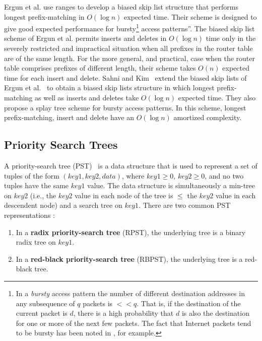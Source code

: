 Ergun et al. \cite{ergun} use ranges to develop a biased skip list structure
that performs longest prefix-matching in $O(\log n)$ expected time. Their scheme
is designed to
give good expected performance for bursty\footnote{In
a {\em bursty}
access pattern the number of different destination addresses in any
subsequence of $q$ packets is
$<< q$. That is, if the destination of the
current packet is $d$, there is a high probability that $d$ is
also the destination for one or more of the next few packets.
The fact that Internet packets tend to be bursty has been
noted in \cite{claffy,lin}, for example.}
access patterns''.
The biased skip list scheme of Ergun et al. \cite{ergun} permits
inserts and deletes in $O(\log n)$ time only in the severely restricted and
impractical situation when all prefixes in the router table are of the same
length. For the more general, and practical, case when the router table
comprises prefixes of different length, their scheme takes $O(n)$
expected time for each insert and delete.
Sahni and Kim~\cite{sahni4} extend the biased
skip lists of Ergun et al.~\cite{ergun}
to obtain a biased skip lists structure in which longest prefix-matching
as well as inserts and deletes take $O(\log n)$ expected time. They also
propose a splay tree scheme for bursty access patterns. In this scheme,
longest prefix-matching, insert and delete have an $O(\log n)$ amortized
complexity.

\subsection{Priority Search Trees}\label{sec:pstprefix}
A priority-search tree (PST)~\cite{mc} is a data structure that is used to
represent a set of tuples of the form $(key1, key2, data)$,
where $key1 \geq 0$, $key2 \geq 0$, and no two tuples have the
same $key1$ value.
The data structure is simultaneously a min-tree on $key2$ (i.e.,
the $key2$ value in each node of the tree is $\leq$ the
$key2$ value in each descendent node)
and a search tree on $key1$. 
There are two common PST representations \cite{mc}:
\begin{enumerate}
\item
In a {\bf radix priority-search tree} (RPST), the underlying tree is a binary
radix tree on $key1$.
\item
In a {\bf red-black priority-search tree} (RBPST), the underlying tree
is a red-black tree.
\end{enumerate}

